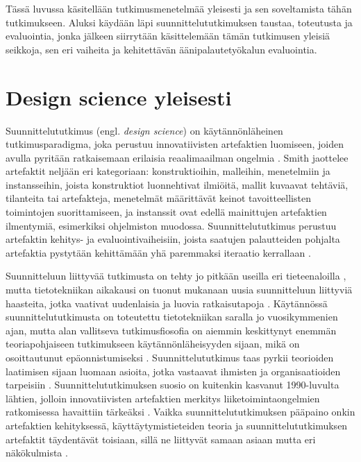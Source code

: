 \documentclass[utf8]{gradu3}
\begin{document}
Tässä luvussa käsitellään tutkimusmenetelmää yleisesti ja sen soveltamista tähän tutkimukseen. Aluksi käydään läpi suunnittelututkimuksen taustaa, toteutusta ja evaluointia, jonka jälkeen siirrytään käsittelemään tämän tutkimusen yleisiä seikkoja, sen eri vaiheita ja kehitettävän äänipalautetyökalun evaluointia.

\section{Design science yleisesti}
\label{design}

Suunnittelututkimus (engl. \textit{design science}) on käytännönläheinen tutkimusparadigma, joka perustuu innovatiivisten artefaktien luomiseen, joiden avulla pyritään ratkaisemaan erilaisia reaalimaailman ongelmia \parencite{hevner2004}. Smith \parencite*{smith} jaottelee artefaktit neljään eri kategoriaan: konstruktioihin, malleihin, menetelmiin ja instansseihin, joista konstruktiot luonnehtivat ilmiöitä, mallit kuvaavat tehtäviä, tilanteita tai artefakteja, menetelmät määrittävät keinot tavoitteellisten toimintojen suorittamiseen, ja instanssit ovat edellä mainittujen artefaktien ilmentymiä, esimerkiksi ohjelmiston muodossa. Suunnittelututkimus perustuu artefaktin kehitys- ja evaluointivaiheisiin, joista saatujen palautteiden pohjalta artefaktia pystytään kehittämään yhä paremmaksi iteraatio kerrallaan \parencite{cycles}.

Suunnitteluun liittyvää tutkimusta on tehty jo pitkään useilla eri tieteenaloilla \parencite{cross2001}, mutta tietotekniikan aikakausi on tuonut mukanaan uusia suunnitteluun liittyviä haasteita, jotka vaativat uudenlaisia ja luovia ratkaisutapoja \parencite{design}. Käytännössä suunnittelututkimusta on toteutettu tietotekniikan saralla jo vuosikymmenien ajan, mutta alan vallitseva tutkimusfiosofia on aiemmin keskittynyt enemmän teoriapohjaiseen tutkimukseen käytännönläheisyyden sijaan, mikä on osoittautunut epäonnistumiseksi \parencite{pragmatic}. Suunnittelututkimus taas pyrkii teorioiden laatimisen sijaan luomaan asioita, jotka vastaavat ihmisten ja organisaatioiden tarpeisiin \parencite{smith}. Suunnittelututkimuksen suosio on kuitenkin kasvanut 1990-luvulta lähtien, jolloin innovatiivisten artefaktien merkitys liiketoimintaongelmien ratkomisessa havaittiin tärkeäksi \parencite{design}. Vaikka suunnittelututkimuksen pääpaino onkin artefaktien kehityksessä, käyttäytymistieteiden teoria ja suunnittelututkimuksen artefaktit täydentävät toisiaan, sillä ne liittyvät samaan asiaan mutta eri näkökulmista  \parencite{hevner2004}.
\end{document}
